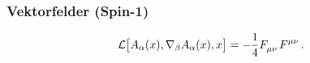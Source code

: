 \subsubsection{Vektorfelder (Spin-1)}
\begin{equation}
\mathcal{L}\left[A_\alpha(x),\nabla_\beta
A_\alpha(x),x\right]=-\frac{1}{4}\tensor{F}{_\mu_\nu}\tensor{F}{^\mu^\nu}\,.
\end{equation}

